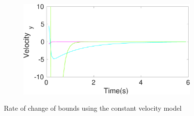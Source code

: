\begin{figure}[!h]
\begin{subfigure}{.5\linewidth}
\end{subfigure}
\begin{subfigure}{.5\linewidth}
\centering
\includegraphics[width=\linewidth]{figures/BoundChange/CV/cv_bound_changeVelocity_y}
\end{subfigure}
\caption{Rate of change of bounds using the constant velocity model}
\end{figure}

